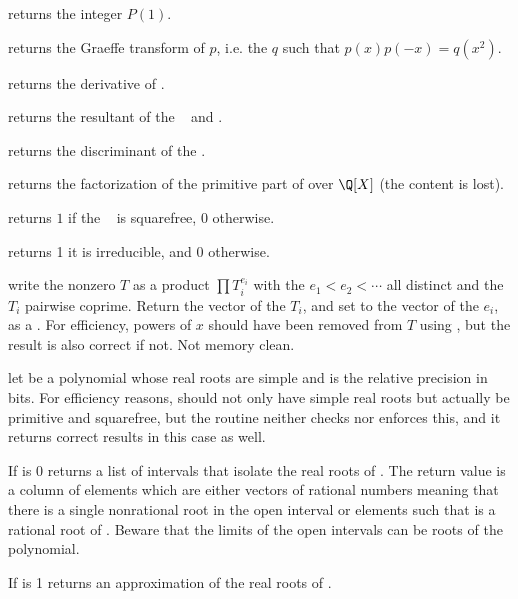  returns the integer $P(1)$.

 returns the Graeffe transform of $p$, i.e. the
 $q$ such that $p(x)p(-x) = q(x^2)$.

 returns the derivative of .

 returns the resultant of the
~ and .

 returns the discriminant of the 
.

 returns the factorization of the primitive part
of  over $\Q[X]$ (the content is lost).

 returns $1$ if the
~ is squarefree, $0$ otherwise.

 returns 1 it  is irreducible, and
0 otherwise.

 write the nonzero  $T$ as a
product $\prod T_i^{e_i}$ with the $e_1 < e_2 < \cdots$ all distinct and the
$T_i$ pairwise coprime. Return the vector of the $T_i$, and set  to
the vector of the $e_i$, as a . For efficiency, powers of $x$
should have been removed from $T$ using , but the result is
also correct if not. Not memory clean.

 let  be a
 polynomial whose real roots are simple and  is the
relative precision in bits. For efficiency reasons,  should not only
have simple real roots but actually be primitive and squarefree, but the
routine neither checks nor enforces this, and it returns correct results in
this case as well.

\item If  is 0 returns a list of intervals that isolate the real
roots of . The return value is a column of elements which are either
vectors \kbd{[a,b]} of rational numbers meaning that there is a single
nonrational root in the open interval  or elements  such
that  is a rational root of . Beware that the limits of the
open intervals can be roots of the polynomial.

\item If  is 1 returns an approximation of the real roots of .

